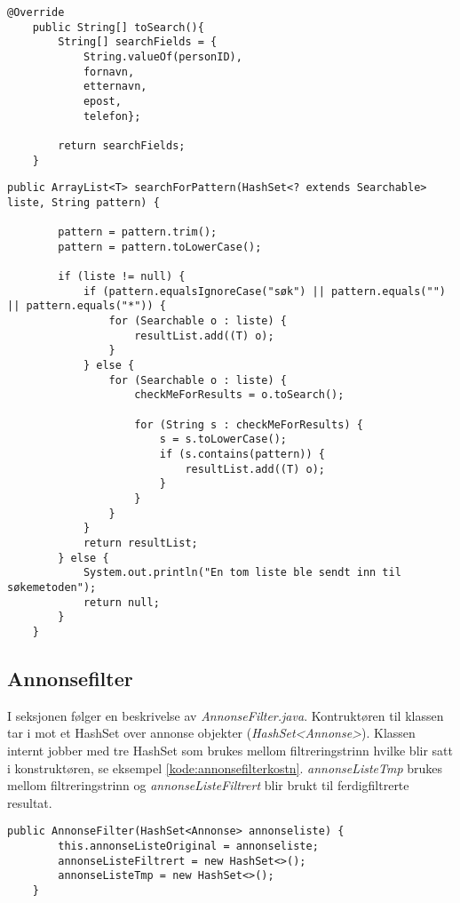 \begin{lstlisting}[caption=Implemntasjon av metode \emph{toSearch() i klassen Person.java}, label=kode:mgs2]
	@Override
    public String[] toSearch(){
        String[] searchFields = {
            String.valueOf(personID), 
            fornavn, 
            etternavn, 
            epost, 
            telefon};
        
        return searchFields;
    }
\end{lstlisting}


\begin{lstlisting}[caption=Iterasjon over generisk \emph{HashSet} som implementerer interface \emph{Searchable}, label=kode:msg3]
    public ArrayList<T> searchForPattern(HashSet<? extends Searchable> liste, String pattern) {

        pattern = pattern.trim();
        pattern = pattern.toLowerCase();

        if (liste != null) {
            if (pattern.equalsIgnoreCase("søk") || pattern.equals("") || pattern.equals("*")) {
                for (Searchable o : liste) {
                    resultList.add((T) o);
                }
            } else {
                for (Searchable o : liste) {
                    checkMeForResults = o.toSearch();

                    for (String s : checkMeForResults) {
                        s = s.toLowerCase();
                        if (s.contains(pattern)) {
                            resultList.add((T) o);
                        }
                    }
                }
            }
            return resultList;
        } else {
            System.out.println("En tom liste ble sendt inn til søkemetoden");
            return null;
        }
    }
\end{lstlisting}

\subsection{Annonsefilter} \label{sec:annonsesok}
I seksjonen følger en beskrivelse av \emph{AnnonseFilter.java}. Kontruktøren til klassen tar i mot et HashSet over annonse objekter (\emph{HashSet<Annonse>}). Klassen internt jobber med tre HashSet som brukes mellom filtreringstrinn hvilke blir satt i konstruktøren, se eksempel \ref{kode:annonsefilterkostn}. \emph{annonseListeTmp} brukes mellom filtreringstrinn og \emph{annonseListeFiltrert} blir brukt til ferdigfiltrerte resultat.  

\begin{lstlisting}[caption=AnnonseFilter.java: Konstruktør, label=kode:annonsefilterkostn]
    public AnnonseFilter(HashSet<Annonse> annonseliste) {
        this.annonseListeOriginal = annonseliste;
        annonseListeFiltrert = new HashSet<>();
        annonseListeTmp = new HashSet<>();
    }
\end{lstlisting}

